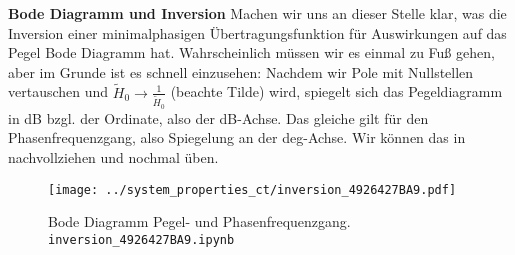 \begin{mdframed}
\textbf{Bode Diagramm und Inversion}
Machen wir uns an dieser Stelle klar, was die Inversion einer
minimalphasigen Übertragungsfunktion für Auswirkungen auf das Pegel Bode Diagramm
hat. Wahrscheinlich müssen wir es einmal zu Fuß gehen, aber im Grunde ist
es schnell einzusehen: Nachdem wir Pole mit Nullstellen vertauschen und
$\tilde{H}_0\to \frac{1}{\tilde{H}_0}$ (beachte Tilde) wird, spiegelt sich
das Pegeldiagramm in dB bzgl. der Ordinate, also der dB-Achse. Das gleiche
gilt für den Phasenfrequenzgang, also Spiegelung an der deg-Achse.
Wir können das in  nachvollziehen
und nochmal üben.


\end{mdframed}

\begin{figure*}[h]
\centering
\begin{subfigure}{\textwidth}
\texttt{[image: ../system\_properties\_ct/inversion\_4926427BA9.pdf]}
\caption{Bode Diagramm Pegel- und Phasenfrequenzgang. \texttt{inversion\_4926427BA9.ipynb}}
\label{fig:inversion_4926427BA9}
\end{subfigure}
\begin{subfigure}{\textwidth}
\centering
{}
\end{subfigure}
\end{figure*}
